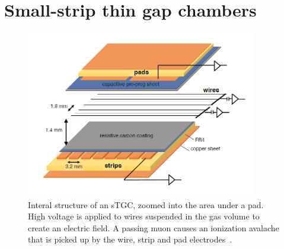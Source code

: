 
\section{Small-strip thin gap chambers}

\begin{figure}[t]
    \centering
    \includegraphics[width = 0.9\textwidth]{figures/stgc_internals.png}
    \caption{Interal structure of an sTGC, zoomed into the area under a pad. High voltage is applied to wires suspended in the gas volume to create an electric field. A passing muon causes an ionization avalache that is picked up by the wire, strip and pad electrodes~\cite{lefebvre_precision_2020}.}
    \label{fig:stgc_internals}
\end{figure}

